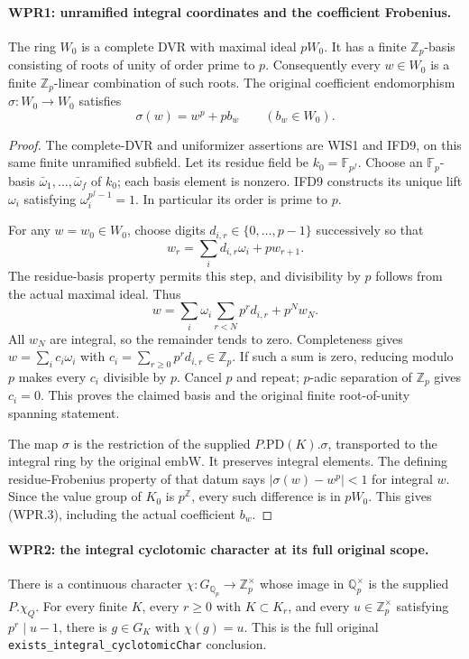\paragraph{WPR1: unramified integral coordinates and the coefficient Frobenius.}
\label{claim:WPR1}
The ring $W_0$ is a complete DVR with maximal ideal $pW_0$.
It has a finite $\mathbb Z_p$-basis consisting of roots of unity
of order prime to $p$. Consequently every $w\in W_0$ is a
finite $\mathbb Z_p$-linear combination of such roots. The
original coefficient endomorphism $\sigma:W_0\to W_0$ satisfies
\[
                  \sigma(w)=w^p+p b_w\qquad(b_w\in W_0).
 \tag{WPR.3}
\]

\begin{proof}
The complete-DVR and uniformizer assertions are WIS1 and IFD9,
on this same finite unramified subfield. Let its residue field be
$k_0=\mathbb F_{p^f}$. Choose an $\mathbb F_p$-basis
$\bar\omega_1,\ldots,\bar\omega_f$ of $k_0$; each basis element
is nonzero. IFD9 constructs its unique lift $\omega_i$ satisfying
$\omega_i^{p^f-1}=1$. In particular its order is prime to $p$.

For any $w=w_0\in W_0$, choose digits $d_{i,r}\in\{0,\ldots,p-1\}$
successively so that
\[
 w_r=\sum_i d_{i,r}\omega_i+p w_{r+1}.
\]
The residue-basis property permits this step, and divisibility
by $p$ follows from the actual maximal ideal. Thus
\[
 w=\sum_i\omega_i\sum_{r<N}p^r d_{i,r}+p^Nw_N.
\]
All $w_N$ are integral, so the remainder tends to zero. Completeness
gives $w=\sum_i c_i\omega_i$ with
$c_i=\sum_{r\geq0}p^r d_{i,r}\in\mathbb Z_p$. If such a sum is
zero, reducing modulo $p$ makes every $c_i$ divisible by $p$.
Cancel $p$ and repeat; $p$-adic separation of $\mathbb Z_p$ gives
$c_i=0$. This proves the claimed basis and the original finite
root-of-unity spanning statement.

The map $\sigma$ is the restriction of the supplied
$P.\mathrm{PD}(K).\sigma$, transported to the integral ring by
the original $\mathrm{embW}$. It preserves integral elements.
The defining residue-Frobenius property of that datum says
$|\sigma(w)-w^p|<1$ for integral $w$. Since the value group of
$K_0$ is $p^{\mathbb Z}$, every such difference is in $pW_0$.
This gives (WPR.3), including the actual coefficient $b_w$.
\end{proof}

\paragraph{WPR2: the integral cyclotomic character at its full original scope.}
\label{claim:WPR2}
There is a continuous character
$\chi:G_{\mathbb Q_p}\to\mathbb Z_p^\times$ whose image in
$\mathbb Q_p^\times$ is the supplied $P.\chi_Q$. For every finite
$K$, every $r\geq0$ with $K\subset K_r$, and every
$u\in\mathbb Z_p^\times$ satisfying $p^r\mid u-1$, there is
$g\in G_K$ with $\chi(g)=u$. This is the full original
\texttt{exists\_integral\_cyclotomicChar} conclusion.

